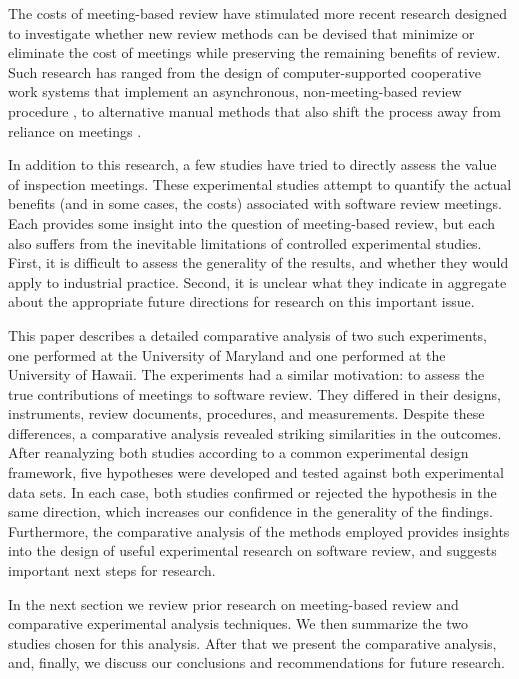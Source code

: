 The costs of meeting-based review have stimulated more recent research
designed to investigate whether new review methods can be devised that 
minimize or eliminate the cost of meetings while 
preserving the remaining benefits of review. Such research has ranged from
the design of computer-supported cooperative work systems that implement
an asynchronous, non-meeting-based review procedure \cite{Johnson94}, to 
alternative manual methods that also shift the process away from reliance
on meetings \cite{PVB:TSE94}.  

In addition to this research, a few studies have tried to directly
assess the value of inspection meetings. These experimental studies
attempt to quantify the actual benefits (and in some cases, the costs)
associated with software review meetings.  Each provides
some insight into the question of meeting-based review, but each also
suffers from the inevitable limitations of controlled experimental studies.
First, it is difficult to assess the generality of the results, and whether
they would apply to industrial practice. Second, it is unclear what
they indicate in aggregate about the appropriate future directions for
research on this important issue.

This paper describes a detailed comparative analysis of two such
experiments, one performed at the University of Maryland and one performed
at the University of Hawaii.  The experiments had a similar motivation: to
assess the true contributions of meetings to software review. They differed
in their designs, instruments, review documents, procedures, and
measurements. Despite these differences, a comparative analysis revealed
striking similarities in the outcomes. After reanalyzing both studies
according to a common experimental design framework, five hypotheses were
developed and tested against both experimental data sets. In each case,
both studies confirmed or rejected the hypothesis in the same direction,
which increases our confidence in the generality of the findings.
Furthermore, the comparative analysis of the methods employed provides
insights into the design of useful experimental research on
software review, and suggests important next steps for research.

In the next section we review prior research on meeting-based review 
and comparative experimental analysis techniques. We then summarize 
the two studies chosen for this analysis. After that we present the 
comparative analysis, and, finally, we discuss our conclusions and 
recommendations for future research.

